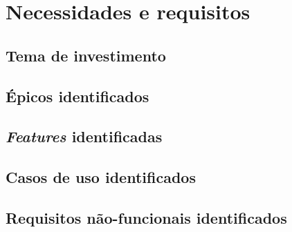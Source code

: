 \chapter{Necessidades e requisitos}
  
  \section{Tema de investimento}
  
  
  \section{Épicos identificados}
  
  
  \section{\textit{Features} identificadas}
  
  
  \section{Casos de uso identificados}
    
    
    
  \section{Requisitos não-funcionais identificados}
